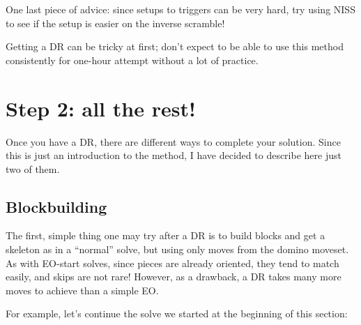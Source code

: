 \documentclass[11pt,a4paper]{book}
\begin{document}
One last piece of advice: since setups to triggers can be very hard, try using NISS to see if the setup is easier on the inverse scramble!

Getting a DR can be tricky at first; don't expect to be able to use this method consistently for one-hour attempt without a lot of practice.

\section{Step 2: all the rest!}

Once you have a DR, there are different ways to complete your solution. Since this is just an introduction to the method, I have decided to describe here just two of them.

\subsection{Blockbuilding}

The first, simple thing one may try after a DR is to build blocks and get a skeleton as in a ``normal'' solve, but using only moves from the domino moveset. As with EO-start solves, since pieces are already oriented, they tend to match easily, and skips are not rare! However, as a drawback, a DR takes many more moves to achieve than a simple EO.

For example, let's continue the solve we started at the beginning of this section:
\end{document}
